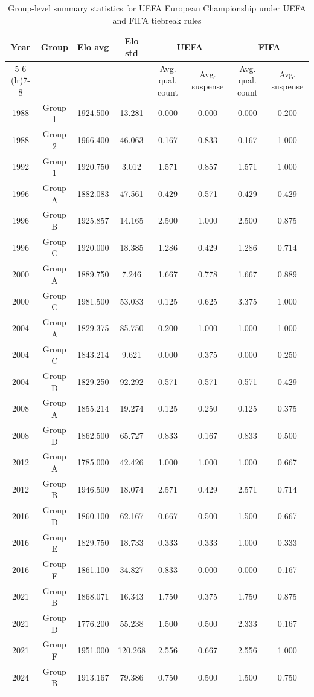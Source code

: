 \begin{table}[H]
\centering
\small
\caption{Group-level summary statistics for UEFA European Championship under UEFA and FIFA tiebreak rules}
\label{tab:eu_diff}
\begin{tabular}{cccccccc}
\toprule
Year & Group & Elo avg & Elo std & \multicolumn{2}{c}{UEFA} & \multicolumn{2}{c}{FIFA} \\
\cmidrule(lr){5-6} \cmidrule(lr){7-8}
 &  &  &  & Avg. qual. count & Avg. suspense & Avg. qual. count & Avg. suspense \\
\midrule
1988 & Group 1 & 1924.500 & 13.281 & 0.000 & 0.000 & 0.000 & 0.200 \\
1988 & Group 2 & 1966.400 & 46.063 & 0.167 & 0.833 & 0.167 & 1.000 \\
1992 & Group 1 & 1920.750 & 3.012 & 1.571 & 0.857 & 1.571 & 1.000 \\
1996 & Group A & 1882.083 & 47.561 & 0.429 & 0.571 & 0.429 & 0.429 \\
1996 & Group B & 1925.857 & 14.165 & 2.500 & 1.000 & 2.500 & 0.875 \\
1996 & Group C & 1920.000 & 18.385 & 1.286 & 0.429 & 1.286 & 0.714 \\
2000 & Group A & 1889.750 & 7.246 & 1.667 & 0.778 & 1.667 & 0.889 \\
2000 & Group C & 1981.500 & 53.033 & 0.125 & 0.625 & 3.375 & 1.000 \\
2004 & Group A & 1829.375 & 85.750 & 0.200 & 1.000 & 1.000 & 1.000 \\
2004 & Group C & 1843.214 & 9.621 & 0.000 & 0.375 & 0.000 & 0.250 \\
2004 & Group D & 1829.250 & 92.292 & 0.571 & 0.571 & 0.571 & 0.429 \\
2008 & Group A & 1855.214 & 19.274 & 0.125 & 0.250 & 0.125 & 0.375 \\
2008 & Group D & 1862.500 & 65.727 & 0.833 & 0.167 & 0.833 & 0.500 \\
2012 & Group A & 1785.000 & 42.426 & 1.000 & 1.000 & 1.000 & 0.667 \\
2012 & Group B & 1946.500 & 18.074 & 2.571 & 0.429 & 2.571 & 0.714 \\
2016 & Group D & 1860.100 & 62.167 & 0.667 & 0.500 & 1.500 & 0.667 \\
2016 & Group E & 1829.750 & 18.733 & 0.333 & 0.333 & 1.000 & 0.333 \\
2016 & Group F & 1861.100 & 34.827 & 0.833 & 0.000 & 0.000 & 0.167 \\
2021 & Group B & 1868.071 & 16.343 & 1.750 & 0.375 & 1.750 & 0.875 \\
2021 & Group D & 1776.200 & 55.238 & 1.500 & 0.500 & 2.333 & 0.167 \\
2021 & Group F & 1951.000 & 120.268 & 2.556 & 0.667 & 2.556 & 1.000 \\
2024 & Group B & 1913.167 & 79.386 & 0.750 & 0.500 & 1.500 & 0.750 \\
\bottomrule
\end{tabular}
\end{table}
